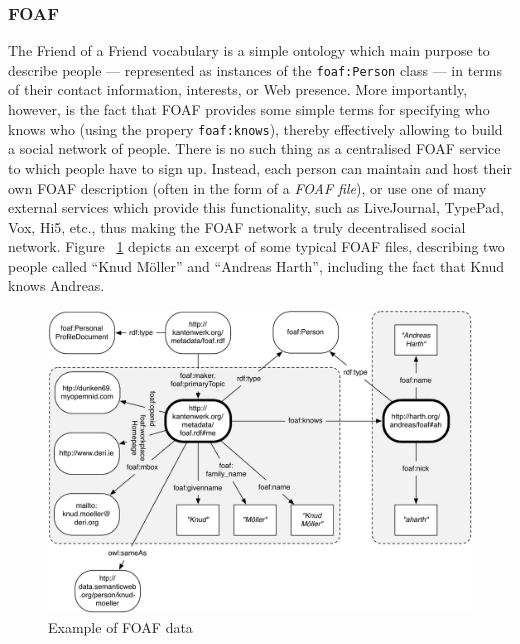 \documentclass{article}
\begin{document}
\subsubsection{FOAF} %
\label{ssub:foaf}

The Friend of a Friend vocabulary is a simple ontology which main purpose to describe people --- represented as instances of the \texttt{foaf:Person} class --- in terms of their contact information, interests, or Web presence. More importantly, however, is the fact that FOAF provides some simple terms for specifying who knows who (using the propery \texttt{foaf:knows}), thereby effectively allowing to build a social network of people. There is no such thing as a centralised FOAF service to which people have to sign up. Instead, each person can maintain and host their own FOAF description (often in the form of a \emph{FOAF file}), or use one of many external services which provide this functionality, such as LiveJournal, TypePad, Vox, Hi5, etc., thus making the FOAF network a truly decentralised social network. Figure ~\ref{fig:foaf_example} depicts an excerpt of some typical FOAF files, describing two people called ``Knud M\"oller'' and ``Andreas Harth'', including the fact that Knud knows Andreas.

\begin{figure}[ht]
  \begin{center}
    \includegraphics[width=\linewidth]{images/foaf_example.pdf}
    \caption{Example of FOAF data}
    \label{fig:foaf_example}
  \end{center}
\end{figure}
\end{document}
